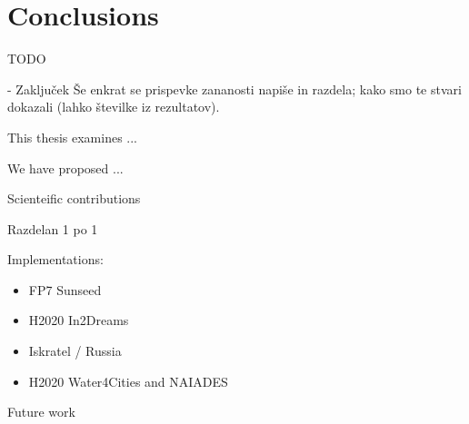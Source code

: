 % 
\chapter{Conclusions}
\label{ch:conclusion}

TODO

- Zaključek
Še enkrat se prispevke zananosti napiše in razdela; kako smo te stvari dokazali (lahko številke iz rezultatov).

This thesis examines ...

We have proposed ...

Scienteific contributions

Razdelan 1 po 1

Implementations:

\begin{itemize}
    \item FP7 Sunseed
    \item H2020 In2Dreams
    \item Iskratel / Russia
    \item H2020 Water4Cities and NAIADES
\end{itemize}


Future work